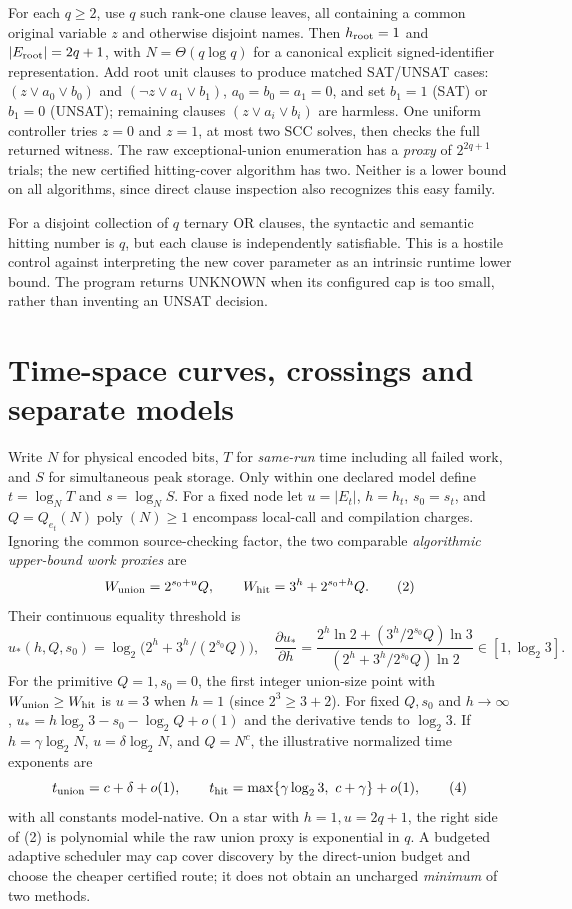 \documentclass[10pt]{article}
\newcommand{\poly}{\operatorname{poly}}
\begin{document}
For each $q\ge2$, use $q$ such rank-one clause leaves, all containing a common original variable $z$ and otherwise disjoint names. Then $h_{\rm root}=1$ and $|E_{\rm root}|=2q+1$, with $N=\Theta(q\log q)$ for a canonical explicit signed-identifier representation. Add root unit clauses to produce matched SAT/UNSAT cases: $(z\vee a_0\vee b_0)$ and $(\neg z\vee a_1\vee b_1)$, $a_0=b_0=a_1=0$, and set $b_1=1$ (SAT) or $b_1=0$ (UNSAT); remaining clauses $(z\vee a_i\vee b_i)$ are harmless. One uniform controller tries $z=0$ and $z=1$, at most two SCC solves, then checks the full returned witness. The raw exceptional-union enumeration has a \emph{proxy} of $2^{2q+1}$ trials; the new certified hitting-cover algorithm has two. Neither is a lower bound on all algorithms, since direct clause inspection also recognizes this easy family.

For a disjoint collection of $q$ ternary OR clauses, the syntactic and semantic hitting number is $q$, but each clause is independently satisfiable. This is a hostile control against interpreting the new cover parameter as an intrinsic runtime lower bound. The program returns UNKNOWN when its configured cap is too small, rather than inventing an UNSAT decision.

\section{Time-space curves, crossings and separate models}
Write $N$ for physical encoded bits, $T$ for \emph{same-run} time including all failed work, and $S$ for simultaneous peak storage. Only within one declared model define $t=\log_N T$ and $s=\log_N S$. For a fixed node let $u=|E_t|$, $h=h_t$, $s_0=s_t$, and $Q=Q_{e_t}(N)\poly(N)\ge1$ encompass local-call and compilation charges. Ignoring the common source-checking factor, the two comparable \emph{algorithmic upper-bound work proxies} are
\[
W_{\rm union}=2^{s_0+u}Q,\qquad
W_{\rm hit}=3^h+2^{s_0+h}Q.
\tag{2}
\]
Their continuous equality threshold is
\[
 u_*(h,Q,s_0)=\log_2\big(2^h+3^h/(2^{s_0}Q)\big),
\quad
\frac{\partial u_*}{\partial h}
=\frac{2^h\ln2+(3^h/2^{s_0}Q)\ln3}
{(2^h+3^h/2^{s_0}Q)\ln2}\in[1,\log_2 3].
\tag{3}
\]
For the primitive $Q=1,s_0=0$, the first integer union-size point with $W_{\rm union}\ge W_{\rm hit}$ is $u=3$ when $h=1$ (since $2^3\ge3+2$). For fixed $Q,s_0$ and $h\to\infty$, $u_* =h\log_2 3-s_0-\log_2Q+o(1)$ and the derivative tends to $\log_2 3$. If $h=\gamma\log_2N$, $u=\delta\log_2N$, and $Q=N^c$, the illustrative normalized time exponents are
\[
 t_{\rm union}=c+\delta+o(1),\qquad
 t_{\rm hit}=\max\{\gamma\log_2 3,\ c+\gamma\}+o(1),
\tag{4}
\]
with all constants model-native. On a star with $h=1,u=2q+1$, the right side of (2) is polynomial while the raw union proxy is exponential in $q$. A budgeted adaptive scheduler may cap cover discovery by the direct-union budget and choose the cheaper certified route; it does not obtain an uncharged \emph{minimum} of two methods.
\end{document}

